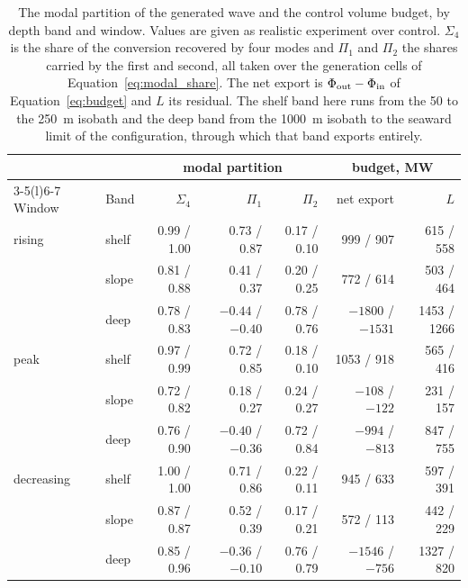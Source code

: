 \documentclass[a4paper,fleqn]{cas-sc}
\begin{document}
\begin{table}[t]
\centering
\caption{The modal partition of the generated wave and the control volume budget, by depth band and window. Values are given as realistic experiment over control. $\Sigma_{4}$ is the share of the conversion recovered by four modes and $\Pi_{1}$ and $\Pi_{2}$ the shares carried by the first and second, all taken over the generation cells of Equation~\ref{eq:modal_share}. The net export is $\Phi_{\rm out}-\Phi_{\rm in}$ of Equation~\ref{eq:budget} and $L$ its residual. The shelf band here runs from the 50 to the 250~m isobath and the deep band from the 1000~m isobath to the seaward limit of the configuration, through which that band exports entirely.}
\label{tab:modal}
\footnotesize
\begin{tabular}{@{}llrrr@{\hskip 2.2em}rr@{}}
\toprule
& & \multicolumn{3}{c}{modal partition}
  & \multicolumn{2}{c}{budget, MW} \\
\cmidrule(lr){3-5}\cmidrule(l){6-7}
Window & Band & $\Sigma_{4}$ & $\Pi_{1}$ & $\Pi_{2}$
       & net export & $L$ \\
\midrule
rising     & shelf & 0.99 / 1.00 & 0.73 / 0.87 & 0.17 / 0.10
           &  999 /  907 &  615 /  558 \\
           & slope & 0.81 / 0.88 & 0.41 / 0.37 & 0.20 / 0.25
           &  772 /  614 &  503 /  464 \\
           & deep  & 0.78 / 0.83 & $-0.44$ / $-0.40$ & 0.78 / 0.76
           & $-1800$ / $-1531$ & 1453 / 1266 \\
\addlinespace[0.25em]
peak       & shelf & 0.97 / 0.99 & 0.72 / 0.85 & 0.18 / 0.10
           & 1053 /  918 &  565 /  416 \\
           & slope & 0.72 / 0.82 & 0.18 / 0.27 & 0.24 / 0.27
           & $-108$ / $-122$ &  231 /  157 \\
           & deep  & 0.76 / 0.90 & $-0.40$ / $-0.36$ & 0.72 / 0.84
           & $-994$ / $-813$ &  847 /  755 \\
\addlinespace[0.25em]
decreasing & shelf & 1.00 / 1.00 & 0.71 / 0.86 & 0.22 / 0.11
           &  945 /  633 &  597 /  391 \\
           & slope & 0.87 / 0.87 & 0.52 / 0.39 & 0.17 / 0.21
           &  572 /  113 &  442 /  229 \\
           & deep  & 0.85 / 0.96 & $-0.36$ / $-0.10$ & 0.76 / 0.79
           & $-1546$ / $-756$ & 1327 /  820 \\
\bottomrule
\end{tabular}
\end{table}
\end{document}
